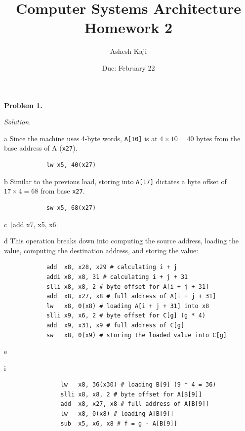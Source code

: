 \documentclass[11pt]{article}
\title{Computer Systems Architecture\\Homework 2}
\author{Ashesh Kaji}
\date{Due: February 22}
\newcommand{\problem}[1]{\vspace{0.5em}\noindent\textbf{Problem #1.}\vspace{0.3em}}
\newenvironment{solution}{\par\noindent\textit{Solution.}}{\par\vspace{1em}}
\begin{document}
\maketitle


\problem{1}
\begin{solution}
    \begin{subproblem}{a}
        Since the machine uses 4-byte words, \texttt{A[10]} is at $4 \times 10 = 40$ bytes from the base address of A (\texttt{x27}).
        \begin{verbatim}
            lw x5, 40(x27)
        \end{verbatim}  
    \end{subproblem}
    \begin{subproblem}{b}
        Similar to the previous load, storing into \texttt{A[17]} dictates a byte offset of $17 \times 4 = 68$ from base \texttt{x27}.
        \begin{verbatim}
            sw x5, 68(x27)
        \end{verbatim}
    \end{subproblem}
    \begin{subproblem}{c}
        \texttt|add x7, x5, x6|
    \end{subproblem}
    \begin{subproblem}{d}
        This operation breaks down into computing the source address, loading the value, computing the destination address, and storing the value:
        \begin{verbatim}
            add  x8, x28, x29 # calculating i + j
            addi x8, x8, 31 # calculating i + j + 31
            slli x8, x8, 2 # byte offset for A[i + j + 31]
            add  x8, x27, x8 # full address of A[i + j + 31]
            lw   x8, 0(x8) # loading A[i + j + 31] into x8
            slli x9, x6, 2 # byte offset for C[g] (g * 4)
            add  x9, x31, x9 # full address of C[g]
            sw   x8, 0(x9) # storing the loaded value into C[g]
        \end{verbatim}
    \end{subproblem}
    \begin{subproblem}{e}
        \begin{subproblem}{i}
            \begin{verbatim}
                lw   x8, 36(x30) # loading B[9] (9 * 4 = 36)
                slli x8, x8, 2 # byte offset for A[B[9]]
                add  x8, x27, x8 # full address of A[B[9]]
                lw   x8, 0(x8) # loading A[B[9]]
                sub  x5, x6, x8 # f = g - A[B[9]]

\end{verbatim}
\end{subproblem}
\end{subproblem}
\end{solution}
\end{document}
